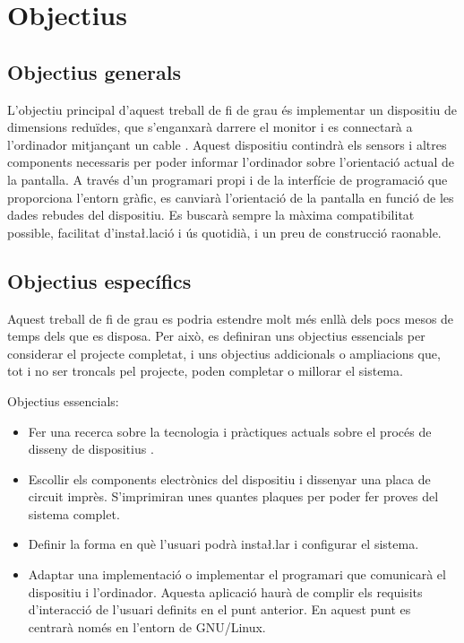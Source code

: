 \chapter{Objectius}
\label{cap:objectius}

\section{Objectius generals}

L'objectiu principal d'aquest treball de fi de grau és implementar un dispositiu
de dimensions reduïdes, que s'enganxarà darrere el monitor i es connectarà
a l'ordinador mitjançant un cable . Aquest dispositiu contindrà els
sensors i altres components necessaris per poder informar l'ordinador sobre
l'orientació actual de la pantalla. A través d'un programari propi i de la
interfície de programació que proporciona l'entorn gràfic, es canviarà
l'orientació de la pantalla en funció de les dades rebudes del dispositiu. Es
buscarà sempre la màxima compatibilitat possible, facilitat d'insta\l.lació i
ús quotidià, i un preu de construcció raonable.


\section{Objectius específics}

Aquest treball de fi de grau es podria estendre molt més enllà dels pocs mesos
de temps dels que es disposa. Per això, es definiran uns objectius essencials
per considerar el projecte completat, i uns objectius addicionals o
ampliacions que, tot i no ser troncals pel projecte, poden completar o
millorar el sistema.

Objectius essencials:
\begin{itemize}
    \item Fer una recerca sobre la tecnologia i pràctiques actuals sobre el 
    procés de disseny de dispositius .
    \item Escollir els components electrònics del dispositiu i dissenyar una
    placa de circuit imprès. S'imprimiran unes quantes plaques per poder fer
    proves del sistema complet.
    \item Definir la forma en què l'usuari podrà insta\l.lar i configurar
    el sistema.
    \item Adaptar una implementació o implementar el programari que comunicarà
    el dispositiu i l'ordinador. Aquesta aplicació haurà de complir els
    requisits d'interacció de l'usuari definits en el punt anterior. En aquest
    punt es centrarà només en l'entorn de GNU/Linux.
\end{itemize}

